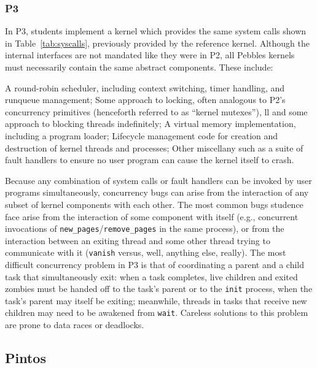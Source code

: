 \subsubsection{P3}
In P3, students implement a kernel which provides the same system calls shown in Table~\ref{tab:syscalls}, previously provided by the reference kernel.
Although the internal interfaces are not mandated like they were in P2, all Pebbles kernels must necessarily contain the same abstract components. These include:
\begin{itemize}
	\llitem A round-robin scheduler, including context switching, timer handling, and runqueue management;
	\llitem Some approach to locking, often analogous to P2's concurrency primitives (henceforth referred to as ``kernel mutexes''), 
	 ll       and some approach to blocking threads indefinitely;
	\llitem A virtual memory implementation, including a program loader;
	\llitem Lifecycle management code for creation and destruction of kernel threads and processes;
	\llitem Other miscellany such as a suite of fault handlers to ensure no user program can cause the kernel itself to crash.
\end{itemize}
Because any combination of system calls or fault handlers can be invoked by user programs simultaneously,
concurrency bugs can arise from the interaction of any subset of kernel components with each other.
The most common bugs studence face arise from the interaction of some component with itself (e.g., concurrent invocations of {\tt new\_pages}/{\tt remove\_pages} in the same process),
or from the interaction between an exiting thread and some other thread trying to communicate with it ({\tt vanish} versus, well, anything else, really).
The most difficult concurrency problem in P3 is that of coordinating a parent and a child task that simultaneously exit:
when a task completes, live children and exited zombies must be handed off to the task's parent or to the {\tt init} process,
when the task's parent may itself be exiting;
meanwhile, threads in tasks that receive new children may need to be awakened from {\tt wait}.
Careless solutions to this problem are prone to data races or deadlocks.

\subsection{Pintos}
\label{sec:overview-pintos}

